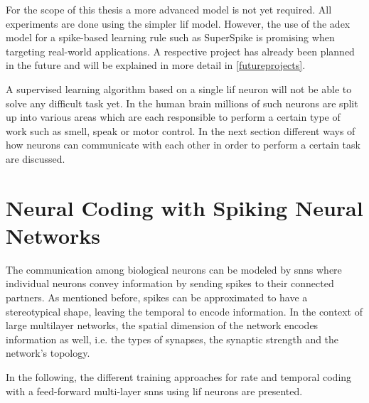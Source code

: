 For the scope of this thesis a more advanced model is not yet required. All experiments are done using the simpler \gls{lif} model. However, the use of the \gls{adex} model for a spike-based learning rule such as SuperSpike is promising when targeting real-world applications. A respective project has already been planned in the future and will be explained in more detail in \cref{futureprojects}.

A supervised learning algorithm based on a single \gls{lif} neuron will not be able to solve any difficult task yet. In the human brain millions of such neurons are split up into various areas which are each responsible to perform a certain type of work such as smell, speak or motor control. In the next section different ways of how neurons can communicate with each other in order to perform a certain task are discussed.

\section{Neural Coding with Spiking Neural Networks}
\label{neuralcoding}
The communication among biological neurons can be modeled by \glspl{snn} where individual neurons convey information by sending spikes to their connected partners. As mentioned before, spikes can be approximated to have a stereotypical shape, leaving the temporal to encode information. In the context of large multilayer networks, the spatial dimension of the network encodes information as well, i.e. the types of synapses, the synaptic strength and the network's topology.


In the following, the different training approaches for rate and temporal coding with a feed-forward multi-layer \glspl{snn} using \gls{lif} neurons are presented.

